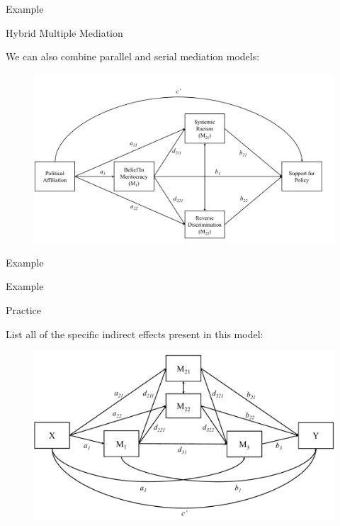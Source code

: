 \documentclass{beamer}
\begin{document}
\begin{frame}[shrink = 5]{Example}
  


\end{frame}



\begin{frame}{Hybrid Multiple Mediation}

  We can also combine parallel and serial mediation models:
  
  \begin{figure}
    \includegraphics[width=\textwidth]{figures/adamsKlpsHybrid.pdf}
  \end{figure}

\end{frame}



\begin{frame}[allowframebreaks]{Example}
 


\end{frame}


\begin{frame}[shrink = 5]{Example}
  


\end{frame}


\begin{frame}{Practice}
  
  List all of the specific indirect effects present in this model:
  
  \begin{figure}
    \includegraphics[width=\textwidth]{figures/practiceDiagram.pdf}
  \end{figure}
  
\end{frame}
\end{document}
